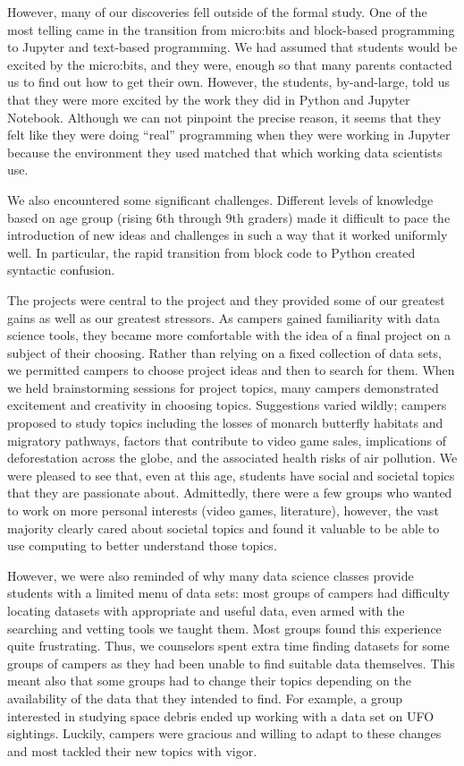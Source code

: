 However, many of our discoveries fell outside of the formal study.
One of the most telling came in the transition from micro:bits and
block-based programming to Jupyter and text-based programming.  We
had assumed that students would be excited by the micro:bits, and
they were, enough so that many parents contacted us to find out how
to get their own.  However, the students, by-and-large, told us
that they were more excited by the work they did in Python and
Jupyter Notebook.  Although we can not pinpoint the precise reason,
it seems that they felt like they were doing ``real'' programming
when they were working in Jupyter because the environment they used
matched that which working data scientists use.

We also encountered some significant challenges.  Different levels
of knowledge based on age group (rising 6th through 9th graders)
made it difficult to pace the introduction of new ideas and challenges
in such a way that it worked uniformly well.  In particular, the
rapid transition from block code to Python created syntactic
confusion.

The projects were central to the project and they provided some of
our greatest gains as well as our greatest stressors.
As campers gained familiarity with data science tools, they became
more comfortable with the idea of a final project on a subject of
their choosing. Rather than relying on a fixed collection of data
sets, we permitted campers to choose project ideas and then to
search for them.  When we held brainstorming sessions for project
topics, many campers demonstrated excitement and creativity in
choosing topics. Suggestions varied wildly; campers proposed to
study topics including the losses of monarch butterfly habitats and
migratory pathways, factors that contribute to video game sales,
implications of deforestation across the globe, and the associated
health risks of air pollution.  We were pleased to see that, even
at this age, students have social and societal topics that they are
passionate about.  Admittedly, there were a few groups who wanted
to work on more personal interests (video games, literature),
however, the vast majority clearly cared about societal topics and
found it valuable to be able to use computing to better understand
those topics.

However, we were also reminded of why many data science classes
provide students with a limited menu of data sets: most groups of
campers had difficulty locating datasets with appropriate and useful
data, even armed with the searching and vetting tools we taught
them.  Most groups found this experience quite frustrating.  Thus,
we counselors spent extra time finding datasets for some groups of
campers as they had been unable to find suitable data themselves.
This meant also that some groups had to change their topics depending
on the availability of the data that they intended to find.  For
example, a group interested in studying space debris ended up working
with a data set on UFO sightings.  Luckily, campers were gracious
and willing to adapt to these changes and most tackled their new
topics with vigor.

